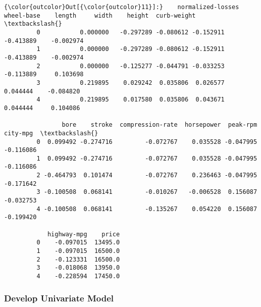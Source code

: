 \documentclass[11pt]{article}
\begin{document}
\begin{Verbatim}[commandchars=\\\{\}]
{\color{outcolor}Out[{\color{outcolor}11}]:}    normalized-losses  wheel-base    length     width    height  curb-weight  \textbackslash{}
         0           0.000000   -0.297289 -0.080612 -0.152911 -0.413889    -0.002974   
         1           0.000000   -0.297289 -0.080612 -0.152911 -0.413889    -0.002974   
         2           0.000000   -0.125277 -0.044791 -0.033253 -0.113889     0.103698   
         3           0.219895    0.029242  0.035806  0.026577  0.044444    -0.084820   
         4           0.219895    0.017580  0.035806  0.043671  0.044444     0.104086   
         
                bore    stroke  compression-rate  horsepower  peak-rpm  city-mpg  \textbackslash{}
         0  0.099492 -0.274716         -0.072767    0.035528 -0.047995 -0.116086   
         1  0.099492 -0.274716         -0.072767    0.035528 -0.047995 -0.116086   
         2 -0.464793  0.101474         -0.072767    0.236463 -0.047995 -0.171642   
         3 -0.100508  0.068141         -0.010267   -0.006528  0.156087 -0.032753   
         4 -0.100508  0.068141         -0.135267    0.054220  0.156087 -0.199420   
         
            highway-mpg    price  
         0    -0.097015  13495.0  
         1    -0.097015  16500.0  
         2    -0.123331  16500.0  
         3    -0.018068  13950.0  
         4    -0.228594  17450.0  
\end{Verbatim}
            
    \subsubsection{Develop Univariate Model}\label{develop-univariate-model}
\end{document}
